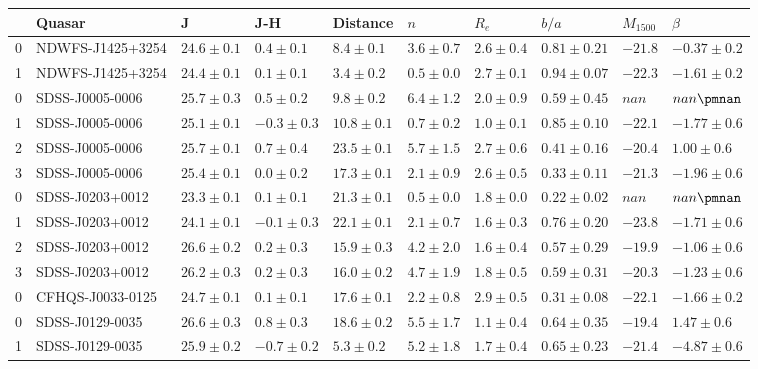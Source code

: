 \begin{tabular}{llllllllll}
\toprule
{} &            Quasar &             J &           J-H &      Distance &          $n$ &        $R_e$ &          $b/a$ & $M_{1500}$ &        $\beta$ \\
\midrule
0 &  NDWFS-J1425+3254 &  $24.6\pm0.1$ &   $0.4\pm0.1$ &   $8.4\pm0.1$ &  $3.6\pm0.7$ &  $2.6\pm0.4$ &  $0.81\pm0.21$ &    $-21.8$ &  $-0.37\pm0.2$ \\
1 &  NDWFS-J1425+3254 &  $24.4\pm0.1$ &   $0.1\pm0.1$ &   $3.4\pm0.2$ &  $0.5\pm0.0$ &  $2.7\pm0.1$ &  $0.94\pm0.07$ &    $-22.3$ &  $-1.61\pm0.2$ \\
0 &   SDSS-J0005-0006 &  $25.7\pm0.3$ &   $0.5\pm0.2$ &   $9.8\pm0.2$ &  $6.4\pm1.2$ &  $2.0\pm0.9$ &  $0.59\pm0.45$ &      $nan$ &    $nan\pmnan$ \\
1 &   SDSS-J0005-0006 &  $25.1\pm0.1$ &  $-0.3\pm0.3$ &  $10.8\pm0.1$ &  $0.7\pm0.2$ &  $1.0\pm0.1$ &  $0.85\pm0.10$ &    $-22.1$ &  $-1.77\pm0.6$ \\
2 &   SDSS-J0005-0006 &  $25.7\pm0.1$ &   $0.7\pm0.4$ &  $23.5\pm0.1$ &  $5.7\pm1.5$ &  $2.7\pm0.6$ &  $0.41\pm0.16$ &    $-20.4$ &   $1.00\pm0.6$ \\
3 &   SDSS-J0005-0006 &  $25.4\pm0.1$ &   $0.0\pm0.2$ &  $17.3\pm0.1$ &  $2.1\pm0.9$ &  $2.6\pm0.5$ &  $0.33\pm0.11$ &    $-21.3$ &  $-1.96\pm0.6$ \\
0 &   SDSS-J0203+0012 &  $23.3\pm0.1$ &   $0.1\pm0.1$ &  $21.3\pm0.1$ &  $0.5\pm0.0$ &  $1.8\pm0.0$ &  $0.22\pm0.02$ &      $nan$ &    $nan\pmnan$ \\
1 &   SDSS-J0203+0012 &  $24.1\pm0.1$ &  $-0.1\pm0.3$ &  $22.1\pm0.1$ &  $2.1\pm0.7$ &  $1.6\pm0.3$ &  $0.76\pm0.20$ &    $-23.8$ &  $-1.71\pm0.6$ \\
2 &   SDSS-J0203+0012 &  $26.6\pm0.2$ &   $0.2\pm0.3$ &  $15.9\pm0.3$ &  $4.2\pm2.0$ &  $1.6\pm0.4$ &  $0.57\pm0.29$ &    $-19.9$ &  $-1.06\pm0.6$ \\
3 &   SDSS-J0203+0012 &  $26.2\pm0.3$ &   $0.2\pm0.3$ &  $16.0\pm0.2$ &  $4.7\pm1.9$ &  $1.8\pm0.5$ &  $0.59\pm0.31$ &    $-20.3$ &  $-1.23\pm0.6$ \\
0 &  CFHQS-J0033-0125 &  $24.7\pm0.1$ &   $0.1\pm0.1$ &  $17.6\pm0.1$ &  $2.2\pm0.8$ &  $2.9\pm0.5$ &  $0.31\pm0.08$ &    $-22.1$ &  $-1.66\pm0.2$ \\
0 &   SDSS-J0129-0035 &  $26.6\pm0.3$ &   $0.8\pm0.3$ &  $18.6\pm0.2$ &  $5.5\pm1.7$ &  $1.1\pm0.4$ &  $0.64\pm0.35$ &    $-19.4$ &   $1.47\pm0.6$ \\
1 &   SDSS-J0129-0035 &  $25.9\pm0.2$ &  $-0.7\pm0.2$ &   $5.3\pm0.2$ &  $5.2\pm1.8$ &  $1.7\pm0.4$ &  $0.65\pm0.23$ &    $-21.4$ &  $-4.87\pm0.6$ \\

\end{tabular}
